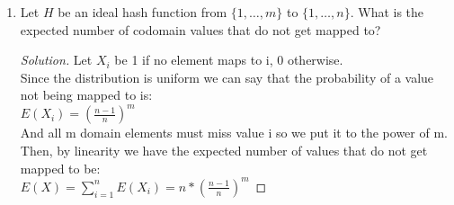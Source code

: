 \documentclass[10pt,letterpaper,unboxed,cm]{article}
\newenvironment{solution}
  {\begin{proof}[Solution]}
  {\end{proof}}
\begin{document}
\begin{enumerate}
\begin{enumerate}
\item
Let $H$ be an ideal hash function from $\{1,\dots, m\}$ to $\{1,\dots, n\}$. What is the expected number of codomain values that do not get mapped to?

\begin{solution}
    
    Let $X_i$ be 1 if no element maps to i, 0 otherwise.\\
    Since the distribution is uniform we can say that the probability of a value not being mapped to is:\\
    \(E(X_i) = (\frac{n-1}{n})^m\)\\
    And all m domain elements must miss value i so we put it to the power of m. Then, by linearity we have the expected number of values that do not get mapped to be:\\
    \(E(X) = \sum_{i=1}^{n} E(X_i) = \boxed{n * (\frac{n-1}{n})^m}\)

\end{solution}

\end{enumerate}

\end{enumerate}
\end{document}
